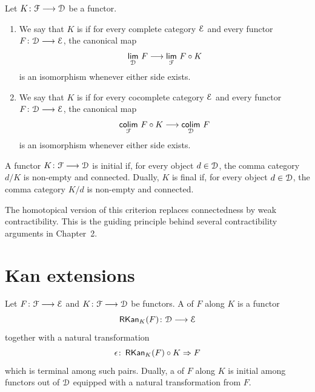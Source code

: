 \begin{definition}\label{ap:: def: initial functor}
    Let $K\colon \mathcal F \longrightarrow \mathcal D$ be a functor.
    \begin{enumerate}
        \item We say that $K$ is  if for every complete category $\mathcal E$ and every functor $F\colon \mathcal D \longrightarrow \mathcal E$, the canonical map
        \begin{equation}
            \Limit[\cD]{F} \longra \Limit[\cF]{F\circ K}
        \end{equation}
        is an isomorphism whenever either side exists.
        \item We say that $K$ is  if for every cocomplete category $\mathcal E$ and every functor $F\colon \mathcal D \longrightarrow \mathcal E$, the canonical map
        \begin{equation}
            \Colimit[\cF]{F\circ K} \longra \Colimit[\cD]{F}
        \end{equation}
        is an isomorphism whenever either side exists.
    \end{enumerate}
\end{definition}

\begin{proposition}
    A functor $K\colon \mathcal F \longrightarrow \mathcal D$ is initial if, for every object $d\in \mathcal D$, the comma category $d/K$ is non-empty and connected. Dually, $K$ is final if, for every object $d\in \mathcal D$, the comma category $K/d$ is non-empty and connected.
\end{proposition}

\begin{remark}
    The homotopical version of this criterion replaces connectedness by weak contractibility. This is the guiding principle behind several contractibility arguments in Chapter~2.
\end{remark}

\section{Kan extensions}\label{ap:: subsec: Kan extensions}

\begin{definition}
    Let $F\colon \mathcal F \longrightarrow \mathcal E$ and $K\colon \mathcal F \longrightarrow \mathcal D$ be functors. A  of $F$ along $K$ is a functor
    \begin{equation}
        \operatorname{{\sf RKan}}_{K}(F)\colon \mathcal D \longrightarrow \mathcal E
    \end{equation}
    together with a natural transformation
    \begin{equation}
        \epsilon \colon \operatorname{{\sf RKan}}_{K}(F)\circ K \Rightarrow F
    \end{equation}
    which is terminal among such pairs. Dually, a  of $F$ along $K$ is initial among functors out of $\mathcal D$ equipped with a natural transformation from $F$.
\end{definition}

